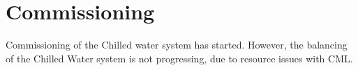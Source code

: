 \section{Commissioning}

Commissioning of the Chilled water system has started. However, the balancing of the Chilled Water system is not progressing, due to resource issues with CML.



















